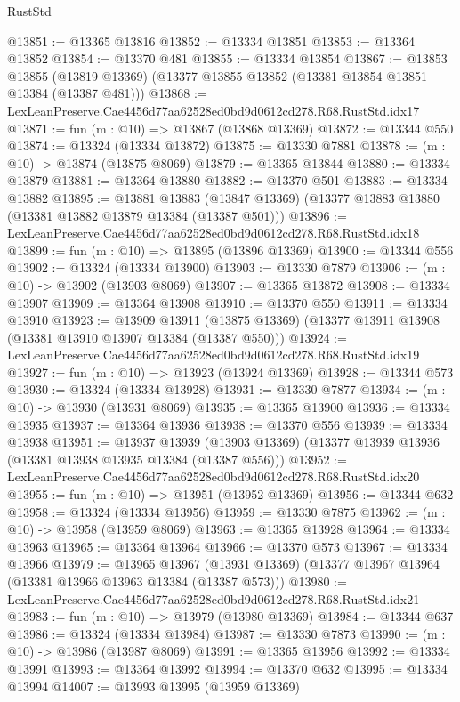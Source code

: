 \begin{lexlean}{RustStd}
\begin{coremodule}
@13851 := @13365 @13816
@13852 := @13334 @13851
@13853 := @13364 @13852
@13854 := @13370 @481
@13855 := @13334 @13854
@13867 := @13853
    @13855
    (@13819 @13369)
    (@13377 @13855 @13852 (@13381 @13854 @13851 @13384 (@13387 @481)))
@13868 := LexLeanPreserve.Cae4456d77aa62528ed0bd9d0612cd278.R68.RustStd.idx17
@13871 := fun (m : @10) => @13867 (@13868 @13369)
@13872 := @13344 @550
@13874 := @13324 (@13334 @13872)
@13875 := @13330 @7881
@13878 := (m : @10) -> @13874 (@13875 @8069)
@13879 := @13365 @13844
@13880 := @13334 @13879
@13881 := @13364 @13880
@13882 := @13370 @501
@13883 := @13334 @13882
@13895 := @13881
    @13883
    (@13847 @13369)
    (@13377 @13883 @13880 (@13381 @13882 @13879 @13384 (@13387 @501)))
@13896 := LexLeanPreserve.Cae4456d77aa62528ed0bd9d0612cd278.R68.RustStd.idx18
@13899 := fun (m : @10) => @13895 (@13896 @13369)
@13900 := @13344 @556
@13902 := @13324 (@13334 @13900)
@13903 := @13330 @7879
@13906 := (m : @10) -> @13902 (@13903 @8069)
@13907 := @13365 @13872
@13908 := @13334 @13907
@13909 := @13364 @13908
@13910 := @13370 @550
@13911 := @13334 @13910
@13923 := @13909
    @13911
    (@13875 @13369)
    (@13377 @13911 @13908 (@13381 @13910 @13907 @13384 (@13387 @550)))
@13924 := LexLeanPreserve.Cae4456d77aa62528ed0bd9d0612cd278.R68.RustStd.idx19
@13927 := fun (m : @10) => @13923 (@13924 @13369)
@13928 := @13344 @573
@13930 := @13324 (@13334 @13928)
@13931 := @13330 @7877
@13934 := (m : @10) -> @13930 (@13931 @8069)
@13935 := @13365 @13900
@13936 := @13334 @13935
@13937 := @13364 @13936
@13938 := @13370 @556
@13939 := @13334 @13938
@13951 := @13937
    @13939
    (@13903 @13369)
    (@13377 @13939 @13936 (@13381 @13938 @13935 @13384 (@13387 @556)))
@13952 := LexLeanPreserve.Cae4456d77aa62528ed0bd9d0612cd278.R68.RustStd.idx20
@13955 := fun (m : @10) => @13951 (@13952 @13369)
@13956 := @13344 @632
@13958 := @13324 (@13334 @13956)
@13959 := @13330 @7875
@13962 := (m : @10) -> @13958 (@13959 @8069)
@13963 := @13365 @13928
@13964 := @13334 @13963
@13965 := @13364 @13964
@13966 := @13370 @573
@13967 := @13334 @13966
@13979 := @13965
    @13967
    (@13931 @13369)
    (@13377 @13967 @13964 (@13381 @13966 @13963 @13384 (@13387 @573)))
@13980 := LexLeanPreserve.Cae4456d77aa62528ed0bd9d0612cd278.R68.RustStd.idx21
@13983 := fun (m : @10) => @13979 (@13980 @13369)
@13984 := @13344 @637
@13986 := @13324 (@13334 @13984)
@13987 := @13330 @7873
@13990 := (m : @10) -> @13986 (@13987 @8069)
@13991 := @13365 @13956
@13992 := @13334 @13991
@13993 := @13364 @13992
@13994 := @13370 @632
@13995 := @13334 @13994
@14007 := @13993
    @13995
    (@13959 @13369)

\end{coremodule}
\end{lexlean}
